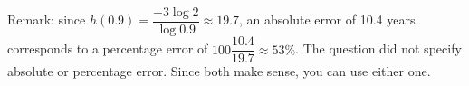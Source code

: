 \begin{solution}
Remark: since $h(0.9)=\dfrac{-3\log 2}{\log 0.9} \approx 19.7$, an absolute error of 10.4 years corresponds to a percentage error of $100\dfrac{10.4}{19.7}\approx 53\%$. The question did not specify absolute or percentage error. Since both make sense, you can use either one.
\end{solution}
